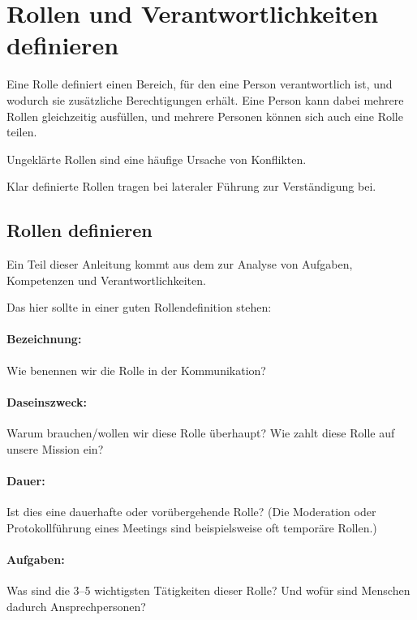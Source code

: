 \section{Rollen und Verantwortlichkeiten definieren}
\label{rollen}

Eine Rolle definiert einen Bereich, für den eine Person verantwortlich ist, und wodurch sie zusätzliche Berechtigungen erhält. Eine Person kann dabei mehrere Rollen gleichzeitig ausfüllen, und mehrere Personen können sich auch eine Rolle teilen.

Ungeklärte Rollen sind eine häufige Ursache von Konflikten.

Klar definierte Rollen tragen bei lateraler Führung zur Verständigung bei.

\subsection{Rollen definieren}

Ein Teil dieser Anleitung kommt aus dem  zur Analyse von Aufgaben, Kompetenzen und Verantwortlichkeiten.~\cite{kessler-projektmanagement}

Das hier sollte in einer guten Rollendefinition stehen:

\paragraph{Bezeichnung:} Wie benennen wir die Rolle in der Kommunikation?

\paragraph{Daseinszweck:} Warum brauchen/wollen wir diese Rolle überhaupt? Wie zahlt diese Rolle auf unsere Mission ein?

\paragraph{Dauer:} Ist dies eine dauerhafte oder vorübergehende Rolle? (Die Moderation oder Protokollführung eines Meetings sind beispielsweise oft temporäre Rollen.)

\paragraph{Aufgaben:} Was sind die 3--5 wichtigsten Tätigkeiten dieser Rolle? Und wofür sind Menschen dadurch Ansprechpersonen?


